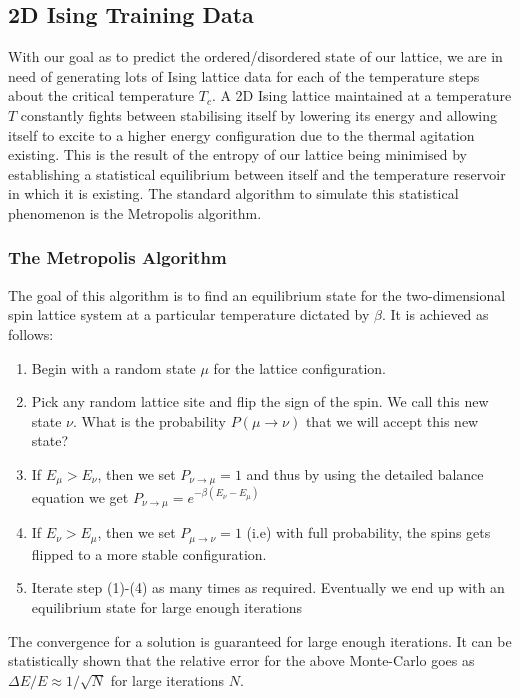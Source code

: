\subsection{2D Ising Training Data}
With our goal as to predict the ordered/disordered state of our lattice, we are in need of generating lots of Ising lattice data for each of the temperature steps about the critical temperature \(T_c\).
A 2D Ising lattice maintained at a temperature $T$ constantly fights between stabilising itself by lowering its energy and allowing itself to excite to a higher energy configuration due to the thermal agitation existing.
This is the result of the entropy of our lattice being minimised by establishing a statistical equilibrium between itself and the temperature reservoir in which it is existing.
The standard algorithm to simulate this statistical phenomenon is the Metropolis algorithm.

\subsubsection{The Metropolis Algorithm}
The goal of this algorithm is to find an equilibrium state for the two-dimensional spin lattice system at a particular temperature dictated by \(\beta\). It is achieved as follows:
\begin{enumerate}
    \item Begin with a random state \(\mu\) for the lattice configuration.
    \item Pick any random lattice site and flip the sign of the spin. We call this new state \(\nu\). What is the probability $P(\mu \rightarrow \nu)$ that we will accept this new state?
    \item If \(E_{\mu}>E_{\nu}\), then we set $P_{\nu \rightarrow \mu} = 1$ and thus by using the detailed balance equation we get $P_{\nu \rightarrow \mu} =e^{-\beta(E_{\nu}-E_{\mu})}$
    \item If $E_{\nu}>E_{\mu}$, then we set $P_{\mu \rightarrow \nu} = 1$ (i.e) with full probability, the spins gets flipped to a more stable configuration.
    \item Iterate step (1)-(4) as many times as required. Eventually we end up with an equilibrium state for large enough iterations
\end{enumerate}

The convergence for a solution is guaranteed for large enough iterations. It can be statistically shown that the relative error for the above Monte-Carlo goes as $\Delta E/E \approx 1/\sqrt{N}$ for large iterations $N$.


